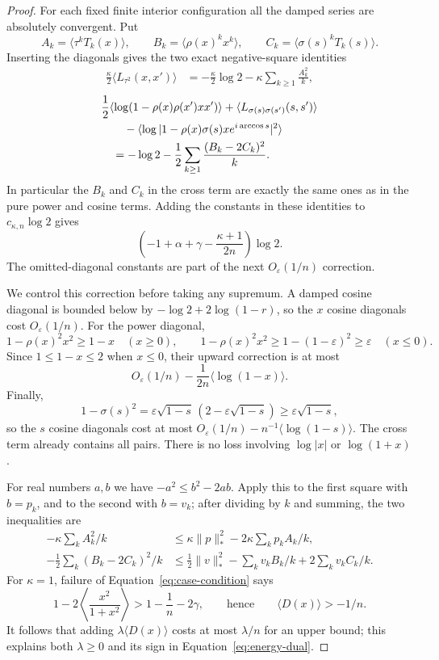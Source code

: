 \begin{proof}
For each fixed finite interior configuration all the damped series are
absolutely convergent.  Put
\[
 A_k=\langle\tau^kT_k(x)\rangle,\qquad
 B_k=\langle\rho(x)^kx^k\rangle,\qquad
 C_k=\langle\sigma(s)^kT_k(s)\rangle.
\]
Inserting the diagonals gives the two exact negative-square identities
\begin{align}
 \frac\kappa2\langle L_{\tau^2}(x,x')\rangle
 &=-\frac\kappa2\log2-\kappa\sum_{k\ge1}\frac{A_k^2}{k},
 \label{eq:energy-first-square}
\end{align}
\begin{align}
 &\frac12\langle\log(1-\rho(x)\rho(x')xx')\rangle
 +\langle L_{\sigma(s)\sigma(s')}(s,s')\rangle\notag\\
 &\qquad-\langle\log|1-\rho(x)\sigma(s)xe^{i\arccos s}|^2\rangle\notag\\
 &\quad=-\log2-\frac12\sum_{k\ge1}\frac{(B_k-2C_k)^2}{k}.
 \label{eq:energy-second-square}
\end{align}
In particular the $B_k$ and $C_k$ in the cross term are exactly the same
ones as in the pure power and cosine terms.  Adding the constants in
these identities to $c_{\kappa,n}\log2$ gives
\[
 \left(-1+\alpha+\gamma-\frac{\kappa+1}{2n}\right)\log2.
\]
The omitted-diagonal constants are part of the next $O_\varepsilon(1/n)$
correction.

We control this correction before taking any supremum.  A damped cosine
diagonal is bounded below by $-\log2+2\log(1-r)$, so the $x$ cosine
diagonals cost $O_\varepsilon(1/n)$.  For the power diagonal,
\[
 1-\rho(x)^2x^2\ge1-x\quad(x\ge0),\qquad
 1-\rho(x)^2x^2\ge1-(1-\varepsilon)^2\ge\varepsilon\quad(x\le0).
\]
Since $1\le1-x\le2$ when $x\le0$, their upward correction is at most
\[
 O_\varepsilon(1/n)-\frac1{2n}\langle\log(1-x)\rangle.
\]
Finally,
\[
 1-\sigma(s)^2
 =\varepsilon\sqrt{1-s}\,(2-\varepsilon\sqrt{1-s})
 \ge\varepsilon\sqrt{1-s},
\]
so the $s$ cosine diagonals cost at most
$O_\varepsilon(1/n)-n^{-1}\langle\log(1-s)\rangle$.
The cross term already contains all pairs.  There is no loss involving
$\log|x|$ or $\log(1+x)$.

For real numbers $a,b$ we have $-a^2\le b^2-2ab$.  Apply this to the
first square with $b=p_k$, and to the second with $b=v_k$; after dividing
by $k$ and summing, the two inequalities are
\begin{align*}
 -\kappa\sum_k A_k^2/k
 &\le\kappa\|p\|_*^2-2\kappa\sum_kp_kA_k/k,\\
 -\tfrac12\sum_k(B_k-2C_k)^2/k
 &\le\tfrac12\|v\|_*^2-\sum_kv_kB_k/k+2\sum_kv_kC_k/k.
\end{align*}
For $\kappa=1$, failure of Equation~\eqref{eq:case-condition} says
\[
 1-2\left\langle\frac{x^2}{1+x^2}\right\rangle
 >1-\frac1n-2\gamma,
 \qquad\text{hence}\qquad \langle D(x)\rangle>-1/n.
\]
It follows that adding $\lambda\langle D(x)\rangle$ costs at most
$\lambda/n$ for an upper bound; this explains both $\lambda\ge0$ and its
sign in Equation~\eqref{eq:energy-dual}.


\end{proof}
